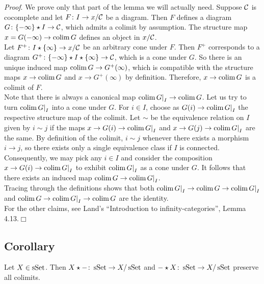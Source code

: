         \emph{Proof}. We prove only that part of the lemma we will actually need. Suppose $\mathcal{C}$ is cocomplete and let $F \colon I \to x/\mathcal{C}$ be a diagram. Then $F$ defines a diagram $G \colon \{-\infty\} \star I \to \mathcal{C}$, which admits a colimit by assumption. The structure map $x = G(-\infty) \to \operatorname*{colim} G$ defines an object in $x/\mathcal{C}$.\\
        Let $F^{+} \colon I \star \{\infty\} \to x/\mathcal{C}$ be an arbitrary cone under $F$. Then $F^{+}$ corresponds to a diagram $G^{+} \colon \{-\infty\} \star I \star \{\infty\} \to \mathcal{C}$, which is a cone under $G$. So there is an unique induced map $\operatorname*{colim} G \to G^{+}(\infty)$, which is compatible with the structure maps $x \to \operatorname*{colim} G$ and $x \to G^{+}(\infty)$ by definition. Therefore, $x \to \operatorname*{colim} G$ is a colimit of $F$.\\
        Note that there is always a canonical map $\operatorname*{colim} {G|}_I \to \operatorname*{colim} G$. Let us try to turn $\operatorname*{colim} {G|}_I$ into a cone under $G$. For $i \in I$, choose as $G(i) \to \operatorname*{colim} {G|}_I$ the respective structure map of the colimit. Let $\sim$ be the equivalence relation on $I$ given by $i \sim j$ if the maps $x \to G(i) \to \operatorname*{colim} {G|}_I$ and $x \to G(j) \to \operatorname*{colim} {G|}_I$ are the same. By definition of the colimit, $i \sim j$ whenever there exists a morphism $i \to j$, so there exists only a single equivalence class if $I$ is connected. Consequently, we may pick any $i \in I$ and consider the composition $x \to G(i) \to \operatorname*{colim} {G|}_I$ to exhibit $\operatorname*{colim} {G|}_I$ as a cone under $G$. It follows that there exists an induced map $\operatorname*{colim} G \to \operatorname*{colim} {G|}_I$.\\
        Tracing through the definitions shows that both $\operatorname*{colim} {G|}_I \to \operatorname*{colim} G \to \operatorname*{colim} {G|}_I$ and $\operatorname*{colim} G \to \operatorname*{colim} {G|}_I \to \operatorname*{colim} G$ are the identity.\\
        For the other claims, see Land's ``Introduction to infinity-categories'', Lemma 4.13.\hfill$\Box$

    \subsection{Corollary}\label{chVI-3-13}
        Let $X \in \operatorname{sSet}$. Then $X \star - \colon \operatorname{sSet} \to X/\operatorname{sSet}$ and $- \star X \colon \operatorname{sSet} \to X/\operatorname{sSet}$ preserve all colimits.
        \smallskip

